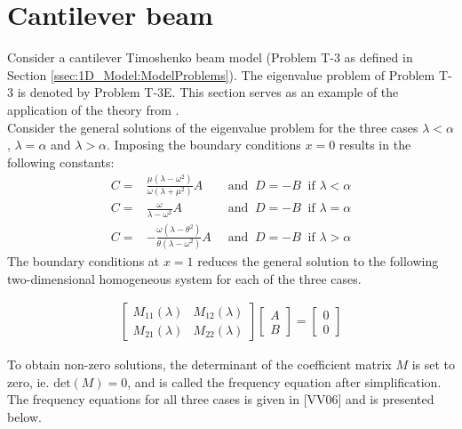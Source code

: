 \documentclass[../../main.tex]{subfiles}
\begin{document}
\section{Cantilever beam} \label{sec:Timo:Cantilever}
Consider a cantilever Timoshenko beam model (Problem T-3 as defined in Section \ref{ssec:1D_Model:ModelProblems}). The eigenvalue problem of Problem T-3 is denoted by Problem T-3E. This section serves as an example of the application of the theory from \cite{VV06}.\\

Consider the general solutions of the eigenvalue problem for the three cases $\lambda < \alpha$, $\lambda = \alpha$ and $\lambda > \alpha$. Imposing the boundary conditions $x = 0$ results in the following constants:
\begin{align}
	C = & \frac{\mu(\lambda-\omega^2)}{\omega(\lambda+\mu^2)}A  \  &\textrm{ and } \ D = -B  \ \textrm{ if } \lambda < \alpha \label{A1}\\
	C = & \frac{\omega}{\lambda - \omega^2}A  \  &\textrm{ and } \ D = -B  \ \textrm{ if } \lambda = \alpha \label{A2}\\
	C = & -\frac{\omega(\lambda-\theta^2)}{\theta(\lambda-\omega^2)}A  \  &\textrm{ and } \ D = -B  \ \textrm{ if } \lambda > \alpha \label{A3}
\end{align}
The boundary conditions at $x = 1$ reduces the general solution to the following two-dimensional homogeneous system for each of the three cases.

\begin{align}
	\begin{bmatrix}
		M_{11}(\lambda) & M_{12}(\lambda)\\
		M_{21}(\lambda) & M_{22}(\lambda)
	\end{bmatrix}
	\begin{bmatrix}
		A\\
		B
	\end{bmatrix}
	= 
	\begin{bmatrix}
		0\\
		0
	\end{bmatrix}
\label{eq:Timo:Cantilever:SystemOfEquations}
\end{align}

To obtain non-zero solutions, the determinant of the coefficient matrix $M$ is set to zero, ie. $\textrm{det}(M) = 0$, and is called the frequency equation after simplification. The frequency equations for all three cases is given in [VV06] and is presented below.\\
\end{document}
